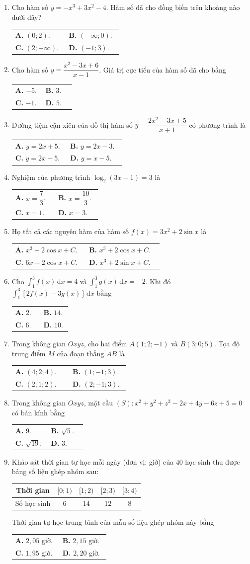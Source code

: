 \documentclass[12pt,a4paper]{article}
\makeatletter
\newcommand{\bonpa}[4]{\par\smallskip\noindent
\begin{tabular}{@{}p{0.47\linewidth}p{0.47\linewidth}@{}}
\textbf{A.} #1 & \textbf{B.} #2\\[3pt]
\textbf{C.} #3 & \textbf{D.} #4\end{tabular}}
\makeatother
\begin{document}
\begin{enumerate}
\item Cho hàm số $y = -x^3 + 3x^2 - 4$. Hàm số đã cho đồng biến trên khoảng nào dưới đây?
\bonpa{$(0; 2)$.}{$(-\infty; 0)$.}{$(2; +\infty)$.}{$(-1; 3)$.}

\item Cho hàm số $y = \dfrac{x^2 - 3x + 6}{x - 1}$. Giá trị cực tiểu của hàm số đã cho bằng
\bonpa{$-5$.}{$3$.}{$-1$.}{$5$.}

\item Đường tiệm cận xiên của đồ thị hàm số $y = \dfrac{2x^2 - 3x + 5}{x + 1}$ có phương trình là
\bonpa{$y = 2x + 5$.}{$y = 2x - 3$.}{$y = 2x - 5$.}{$y = x - 5$.}

\item Nghiệm của phương trình $\log_2(3x - 1) = 3$ là
\bonpa{$x = \dfrac{7}{3}$.}{$x = \dfrac{10}{3}$.}{$x = 1$.}{$x = 3$.}

\item Họ tất cả các nguyên hàm của hàm số $f(x) = 3x^2 + 2\sin x$ là
\bonpa{$x^3 - 2\cos x + C$.}{$x^3 + 2\cos x + C$.}{$6x - 2\cos x + C$.}{$x^3 + 2\sin x + C$.}

\item Cho $\displaystyle\int_1^3 f(x)\,\mathrm{d}x = 4$ và $\displaystyle\int_1^3 g(x)\,\mathrm{d}x = -2$. Khi đó $\displaystyle\int_1^3 [2f(x) - 3g(x)]\,\mathrm{d}x$ bằng
\bonpa{$2$.}{$14$.}{$6$.}{$10$.}

\item Trong không gian $Oxyz$, cho hai điểm $A(1; 2; -1)$ và $B(3; 0; 5)$. Tọa độ trung điểm $M$ của đoạn thẳng $AB$ là
\bonpa{$(4; 2; 4)$.}{$(1; -1; 3)$.}{$(2; 1; 2)$.}{$(2; -1; 3)$.}

\item Trong không gian $Oxyz$, mặt cầu $(S): x^2 + y^2 + z^2 - 2x + 4y - 6z + 5 = 0$ có bán kính bằng
\bonpa{$9$.}{$\sqrt{5}$.}{$\sqrt{19}$.}{$3$.}

\item Khảo sát thời gian tự học mỗi ngày (đơn vị: giờ) của $40$ học sinh thu được bảng số liệu ghép nhóm sau:
\begin{center}
\begin{tabular}{|c|c|c|c|c|}\hline
Thời gian & $[0; 1)$ & $[1; 2)$ & $[2; 3)$ & $[3; 4)$\\\hline
Số học sinh & $6$ & $14$ & $12$ & $8$\\\hline
\end{tabular}
\end{center}
Thời gian tự học trung bình của mẫu số liệu ghép nhóm này bằng
\bonpa{$2{,}05$ giờ.}{$2{,}15$ giờ.}{$1{,}95$ giờ.}{$2{,}20$ giờ.}


\end{enumerate}
\end{document}
